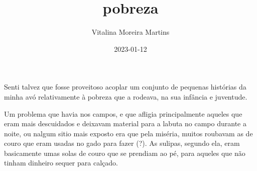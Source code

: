 \documentclass{article}
\title{pobreza}
\author{Vitalina Moreira Martins}
\date{2023-01-12}
\begin{document}
\maketitle
Senti talvez que fosse proveitoso acoplar um conjunto de pequenas histórias da minha avó relativamente à pobreza que a rodeava, na sua infância e juventude.

Um problema que havia nos campos, e que afligia principalmente aqueles que eram mais descuidados e deixavam material para a labuta no campo durante a noite, ou nalgum sitio mais exposto
era que pela miséria, muitos roubavam as  de couro que eram usadas no gado para fazer  (?). 
As sulipas, segundo ela, eram basicamente umas solas de couro que se prendiam ao pé, para aqueles que não tinham dinheiro sequer para calçado.

\printindex
\end{document}

